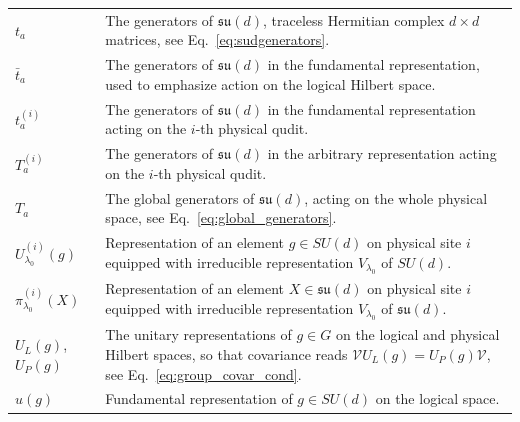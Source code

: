 \documentclass[11pt,letterpaper]{article}
\theoremstyle{plain}
\theoremstyle{plain}
\theoremstyle{plain}
\theoremstyle{plain}
\theoremstyle{plain}
\theoremstyle{plain}
\theoremstyle{plain}
\theoremstyle{definition}
\theoremstyle{plain}
\begin{document}
\begin{tabular}{@{}ll@{}}

\parbox[t]{0.22\textwidth}{$t_a$} & \parbox[t]{0.72\textwidth}{The generators of $\mathfrak{su}(d)$, traceless Hermitian complex $d\times d$ matrices, see Eq.~\eqref{eq:sudgenerators}.} \\[0.6em]

\parbox[t]{0.22\textwidth}{$\bar{t}_a$} & \parbox[t]{0.72\textwidth}{The generators of $\mathfrak{su}(d)$ in the fundamental representation, used to emphasize action on the logical Hilbert space.} \\[0.6em]

\parbox[t]{0.22\textwidth}{$t_a^{(i)}$} & \parbox[t]{0.72\textwidth}{The generators of $\mathfrak{su}(d)$ in the fundamental representation acting on the $i$-th physical qudit.} \\[0.6em]

\parbox[t]{0.22\textwidth}{$T_a^{(i)}$} & \parbox[t]{0.72\textwidth}{The generators of $\mathfrak{su}(d)$ in the arbitrary representation acting on the $i$-th physical qudit.} \\[0.6em]

\parbox[t]{0.22\textwidth}{$T_a$} & \parbox[t]{0.72\textwidth}{The global generators of $\mathfrak{su}(d)$, acting on the whole physical space, see Eq.~\eqref{eq:global_generators}.} \\[0.6em]

\parbox[t]{0.22\textwidth}{$U_{\lambda_0}^{(i)}(g)$} & \parbox[t]{0.72\textwidth}{Representation of an element $g\in SU(d)$ on physical site $i$ equipped with irreducible representation $V_{\lambda_0}$ of $SU(d)$.} \\[0.6em]

\parbox[t]{0.22\textwidth}{$\pi_{\lambda_0}^{(i)}(X)$} & \parbox[t]{0.72\textwidth}{Representation of an element $X\in \mathfrak{su}(d)$ on physical site $i$ equipped with irreducible representation $V_{\lambda_0}$ of $\mathfrak{su}(d)$.} \\[0.6em]

\parbox[t]{0.22\textwidth}{$U_L(g)$, $U_P(g)$} & \parbox[t]{0.72\textwidth}{The unitary representations of $g\in G$ on the logical and physical Hilbert spaces, so that covariance reads $\mathcal{V}U_L(g)=U_P(g)\mathcal{V}$, see Eq.~\eqref{eq:group_covar_cond}.} \\[0.6em]

\parbox[t]{0.22\textwidth}{$u(g)$} & \parbox[t]{0.72\textwidth}{Fundamental representation of $g\in SU(d)$ on the logical space.} \\[0.6em]


\end{tabular}
\end{document}
